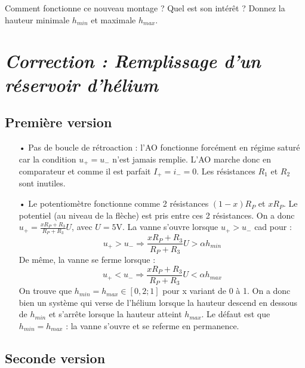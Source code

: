 \documentclass{report}
\begin{document}
Comment fonctionne ce nouveau montage ? Quel est son intérêt ? Donnez la hauteur minimale $h_{min}$ et maximale $h_{max}$.

\newpage

\section*{\textit{Correction : Remplissage d'un réservoir d'hélium}}

\subsection*{Première version}
\begin{itemize}
	\item[•] Pas de boucle de rétroaction : l'AO fonctionne forcément en régime saturé car la condition $u_+=u_-$ n'est jamais remplie. L'AO marche donc en comparateur et comme il est parfait $I_+=i_-=0$. Les résistances $R_1$ et $R_2$ sont inutiles.
	\item[•] Le potentiomètre fonctionne comme 2 résistances $(1-x)R_P$ et $xR_P$. Le potentiel (au niveau de la flèche) est pris entre ces 2 résistances. On a donc $u_+=\frac{xR_P+R_3}{R_P+R_3}U$, avec $U=5$V. La vanne s'ouvre lorsque $u_+>u_-$ cad pour :
	\begin{equation}
		u_+>u_-\Rightarrow\frac{xR_P+R_3}{R_P+R_3}U>\alpha h_{min}
	\end{equation}
	De même, la vanne se ferme lorsque :
	\begin{equation}
		u_+<	u_-\Rightarrow\frac{xR_P+R_3}{R_P+R_3}U<\alpha h_{max}
	\end{equation}
	On trouve que $h_{min}=h_{max}\in\left[ 0,2;1\right] $ pour x variant de 0 à 1.
	On a donc bien un système qui verse de l'hélium lorsque la hauteur descend en dessous de $h_{min}$ et s'arrête lorsque la hauteur atteint $h_{max}$. Le défaut est que $h_{min}=h_{max}$ : la vanne s'ouvre et se referme en permanence.
\end{itemize}

\subsection*{Seconde version}
\end{document}
